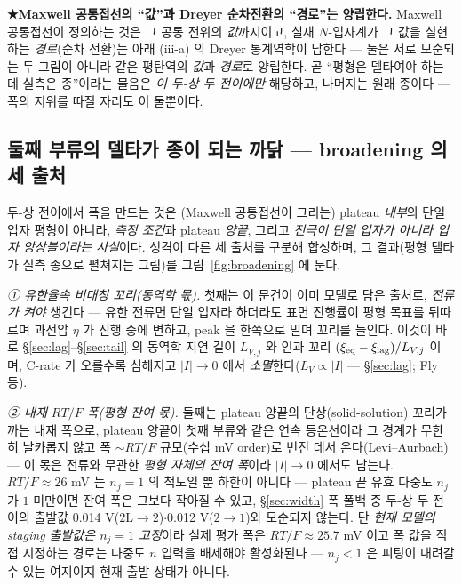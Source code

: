 \textbf{★Maxwell 공통접선의 ``값''과 Dreyer 순차전환의 ``경로''는 양립한다.} Maxwell 공통접선이 정의하는 것은
그 공통 전위의 \emph{값}까지이고, 실재 $N$-입자계가 그 값을 실현하는 \emph{경로}(순차 전환)는 아래 (iii-a) 의
Dreyer 통계역학이 답한다 --- 둘은 서로 모순되는 두 그림이 아니라 같은 평탄역의 \emph{값}과 \emph{경로}로
양립한다. 곧 ``평형은 델타여야 하는데 실측은 종''이라는 물음은 \emph{이 두-상 두 전이에만} 해당하고,
나머지는 원래 종이다 --- 폭의 지위를 따질 자리도 이 둘뿐이다.

\subsection{둘째 부류의 델타가 종이 되는 까닭 --- broadening 의 세 출처}\label{sec:broadening-sources}
두-상 전이에서 폭을 만드는 것은 (Maxwell
공통접선이 그리는) plateau \emph{내부}의 단일 입자 평형이 아니라, \emph{측정 조건}과 plateau \emph{양끝}, 그리고
\emph{전극이 단일 입자가 아니라 입자 앙상블이라는 사실}이다. 성격이 다른 세 출처를 구분해 합성하며, 그 결과(평형 델타가
실측 종으로 펼쳐지는 그림)를 그림~\ref{fig:broadening} 에 둔다.

\emph{① 유한율속 비대칭 꼬리(동역학 몫).} 첫째는 이 문건이 이미 모델로 담은 출처로, \emph{전류가 켜야} 생긴다 --- 유한
전류면 단일 입자라 하더라도 표면 진행률이 평형 목표를 뒤따르며 과전압 $\eta$ 가 진행 중에 변하고, peak 을 한쪽으로
밀며 꼬리를 늘인다. 이것이 바로 \S\ref{sec:lag}--\S\ref{sec:tail} 의 동역학 지연 길이 $L_{V,j}$ 와 인과 꼬리
$(\xi_{\mathrm{eq}}-\xi_\mathrm{lag})/L_{V,j}$ 이며, C-rate 가 오를수록 심해지고 $|I|\!\to\!0$ 에서
\emph{소멸}한다($L_V\propto|I|$ --- \S\ref{sec:lag}; Fly 등\cite{fly2020}).

\emph{② 내재 $RT/F$ 폭(평형 잔여 몫).} 둘째는 plateau 양끝의 단상(solid-solution) 꼬리가 까는 내재 폭으로, plateau
양끝이 첫째 부류와 같은 연속 등온선이라 그 경계가 무한히 날카롭지 않고 폭 $\sim RT/F$ 규모(수십 mV order)로 번진 데서
온다(Levi--Aurbach\cite{leviaurbach1999}) --- 이 몫은 전류와 무관한 \emph{평형 자체의 잔여 폭}이라 $|I|\!\to\!0$ 에서도
남는다. $RT/F\!\approx\!26$ mV 는 $n_j{=}1$ 의 척도일 뿐 하한이 아니다 --- plateau 끝 유효 다중도 $n_j$ 가
$1$ 미만이면 잔여 폭은 그보다 작아질 수 있고, \S\ref{sec:width} 폭 폴백 중 두-상 두 전이의 출발값
0.014 V($2\mathrm L\!\to\!2$)$\cdot$0.012 V($2\!\to\!1$)와 모순되지 않는다. 단 \emph{현재 모델의 staging
출발값은 $n_j{=}1$ 고정}이라 실제 평가 폭은 $RT/F\!\approx\!25.7$ mV 이고 폭 값을 직접 지정하는 경로는 다중도
$n$ 입력을 배제해야 활성화된다 --- $n_j\!<\!1$ 은 피팅이 내려갈 수 있는 여지이지 현재 출발 상태가 아니다.

